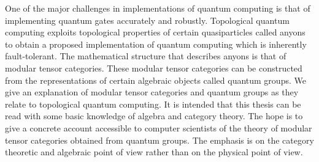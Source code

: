 One of the major challenges in implementations of quantum computing is that of
implementing quantum gates accurately and robustly. Topological quantum
computing exploits topological properties of certain quasiparticles called
anyons to obtain a proposed implementation of quantum computing which is
inherently fault-tolerant. The mathematical structure that describes anyons is
that of modular tensor categories. These modular tensor categories can be
constructed from the representations of certain algebraic objects called
quantum groups. We give an explanation of modular tensor categories and quantum
groups as they relate to topological quantum computing. It is intended that
this thesis can be read with some basic knowledge of algebra and category
theory.  The hope is to give a concrete account accessible to computer
scientists of the theory of modular tensor categories obtained from quantum
groups. The emphasis is on the category theoretic and algebraic point of view
rather than on the physical point of view. 
